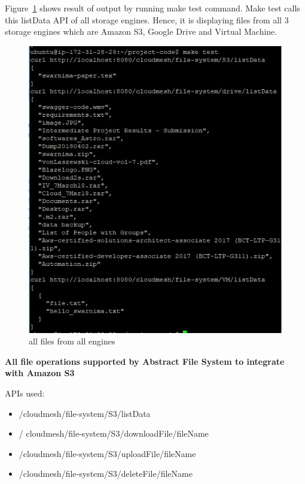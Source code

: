 Figure~\ref{fig:make-test} shows result of output by running make test 
command. Make test calls this listData API of all storage engines. 
Hence, it is displaying files from all 3 storage engines which are 
Amazon S3, Google Drive and Virtual Machine. 

\begin{figure}[!ht]
        \centering\includegraphics[width=\columnwidth]
        {image/make-test.JPG}
        \caption{all files from all engines}\label{fig:make-test}
\end{figure}


\textbf{All file operations supported by Abstract File System to integrate 
with Amazon S3}

APIs used:

\begin{itemize}
    \item /cloudmesh/file-system/S3/listData
    \item / cloudmesh/file-system/S3/downloadFile/{fileName}
    \item /cloudmesh/file-system/S3/uploadFile/{fileName}
    \item /cloudmesh/file-system/S3/deleteFile/{fileName}
\end{itemize}

